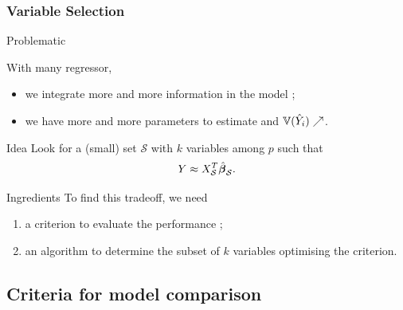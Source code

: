 \documentclass[10pt, c, xcolor=x11names]{beamer}\usepackage[]{graphicx}\usepackage[]{color}
\begin{document}
\begin{frame}
  \frametitle{Variable Selection}

  \begin{block}{Problematic}
    
  With many regressor, 
  \begin{itemize}
  \item we integrate more and more information in the model ;
  \item we have more and more parameters to estimate and $\mathbb{V} (\hat{Y}_i)\nearrow$.
  \end{itemize}  
\end{block}

  \vfill
  
  \begin{block}{Idea}
    Look for a (small)  set $\mathcal{S}$ with  $k$ variables
    among $p$ such that
  \begin{equation*}
    Y \approx X_{\mathcal{S}}^T \,\hat{\!\boldsymbol\beta}_{\mathcal{S}}.
  \end{equation*} 
    \end{block}

  \begin{block}{Ingredients}
    To find this tradeoff, we need
    \begin{enumerate}
    \item a \alert{criterion} to evaluate the performance ;
    \item an \alert{algorithm} to determine the subset of $k$ variables optimising the criterion.
    \end{enumerate}
  \end{block}

\end{frame}

\subsection{Criteria for model comparison}
\end{document}
